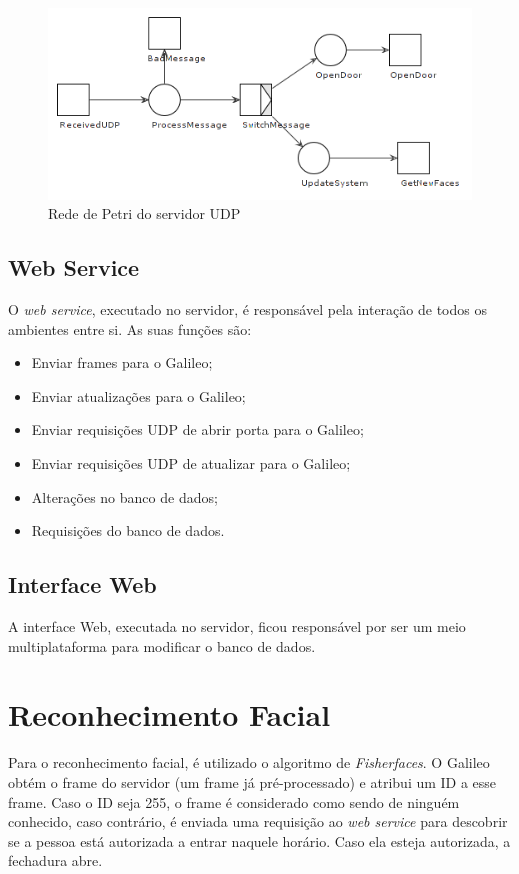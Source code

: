 \documentclass[12pt]{article}
\begin{document}
    \begin{figure}[ht]
		\centering
		\includegraphics[width=.7\textwidth]{petri-udp}
		\caption{Rede de Petri do servidor UDP}
		\label{fig:petri-udp}
	\end{figure}

\subsection{Web Service}
    O \textit{web service}, executado no servidor, é responsável pela interação
    de todos os ambientes entre si. As suas funções são:
    \begin{itemize}
        \item Enviar frames para o Galileo;
        \item Enviar atualizações para o Galileo;
        \item Enviar requisições UDP de abrir porta para o Galileo;
        \item Enviar requisições UDP de atualizar para o Galileo;
        \item Alterações no banco de dados;
        \item Requisições do banco de dados.
    \end{itemize}

\subsection{Interface Web}
    A interface Web, executada no servidor, ficou responsável por ser um meio
    multiplataforma para modificar o banco de dados.

\section{Reconhecimento Facial}
    Para o reconhecimento facial, é utilizado o algoritmo de \textit{Fisherfaces}.
    O Galileo obtém o frame do servidor (um frame já pré-processado) e atribui
    um ID a esse frame. Caso o ID seja 255, o frame é considerado como sendo de
    ninguém conhecido, caso contrário, é enviada uma requisição ao
    \textit{web service} para descobrir se a pessoa está autorizada a entrar
    naquele horário. Caso ela esteja autorizada, a fechadura abre.
\end{document}
